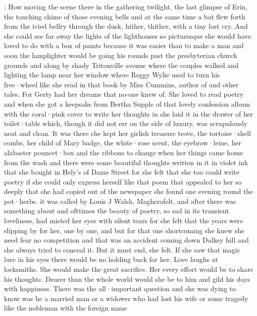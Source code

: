 :
How moving the scene there
in the gathering twilight,
the last glimpse of Erin,
the touching chime of those evening bells
and at the same time
a bat
flew forth from the ivied belfry through the dusk,
hither,
thither,
with a tiny lost cry.
And she could see
far away
the lights of the lighthouses
so picturesque
she would have loved to do with a box of paints
because it was easier
than to make a man
and soon the lamplighter would be going his rounds
past the presbyterian church grounds
and along by shady Tritonville avenue
where the couples walked
and lighting the lamp near her window
where Reggy Wylie used to turn his free·wheel
like she read in that book
 by Miss Cummins,
author of  and other tales.
For Gerty had her dreams
that no-one knew of.
She loved to read poetry
and when she got a keepsake from Bertha Supple
of that lovely confession album
with the coral·pink cover
to write her thoughts in
she laid it in the drawer of her toilet·table
which,
though it did not err on the side of luxury,
was scrupulously neat and clean.
It was there
she kept her girlish treasure trove,
the tortoise·shell combs,
her child of Mary badge,
the white·rose scent,
the eyebrow·leine,
her alabaster pouncet·box
and the ribbons to change
when her things came home from the wash
and there were
some beautiful thoughts written in it
in violet ink that she bought in Hely's of Dame Street
for she felt
that she too could write poetry
if she could only express herself
like that poem that appealed to her so deeply
that she had copied out of the newspaper
she found one evening
round the pot·herbs.
it was called by Louis J Walsh,
Magherafelt,
and after there was something about
and ofttimes
the beauty of poetry,
so sad in its transient loveliness,
had misted her eyes
with silent tears
for she felt
that the years were slipping by for her,
one by one,
and
but for that one shortcoming
she knew she need fear no competition
and that was an accident coming down Dalkey hill
and she always tried to conceal it.
But it must end,
she felt.
If she saw that magic lure in his eyes
there would be no holding back for her.
Love laughs at locksmiths.
She would make the great sacrifice.
Her every effort
would be to share his thoughts.
Dearer than the whole world
would she be to him
and gild his days with happiness.
There was the all·important question
and she was dying to know
was he a married man
or a widower who had lost his wife
or some tragedy
like the nobleman with the foreign name
